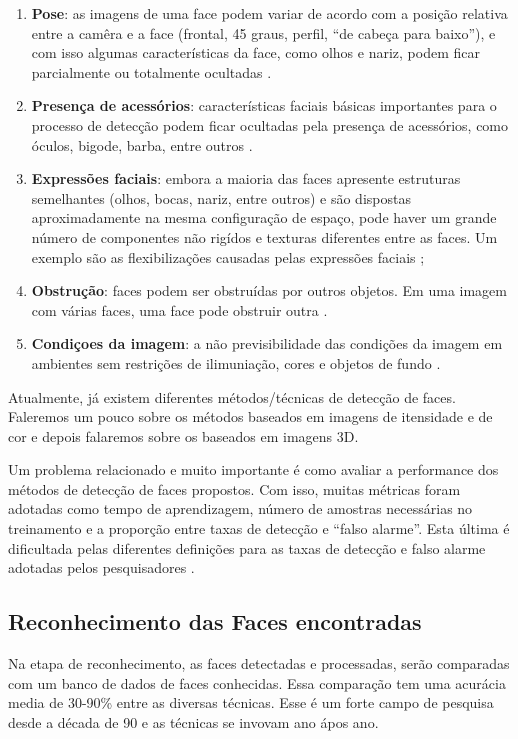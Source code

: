 	\begin{enumerate}
		\item \textbf{Pose}: as imagens de uma face podem variar de acordo com a posição relativa entre a camêra e a face (frontal, 45 graus, perfil, ``de cabeça para baixo''), e com isso algumas características da face, como olhos e nariz, podem ficar parcialmente ou totalmente ocultadas \cite{yang}.
		\item \textbf{Presença de acessórios}: características faciais básicas importantes para o processo de detecção podem ficar ocultadas pela presença de acessórios, como óculos, bigode, barba, entre outros \cite{oliveira, yang}. 
		\item \textbf{Expressões faciais}: embora a maioria das faces apresente estruturas semelhantes (olhos, bocas, nariz, entre outros) e são dispostas aproximadamente na mesma configuração de espaço, pode haver um grande número de componentes não rigídos e texturas diferentes entre as faces. Um exemplo são as flexibilizações causadas pelas expressões faciais \cite{oliveira, yang};
		\item \textbf{Obstrução}: faces podem ser obstruídas por outros objetos. Em uma imagem com várias faces, uma face pode obstruir outra \cite{yang}.
		\item \textbf{Condiçoes da imagem}: a não previsibilidade das condições da imagem em ambientes sem restrições de ilimuniação, cores e objetos de fundo \cite{oliveira, yang}.
	\end{enumerate}

Atualmente, já existem diferentes métodos/técnicas de detecção de faces. Faleremos um pouco sobre os métodos baseados em imagens de itensidade e de cor e depois falaremos sobre os baseados em imagens 3D.

Um problema relacionado e muito importante é como avaliar a performance dos métodos de detecção de faces propostos. Com isso, muitas métricas foram adotadas como tempo de aprendizagem, número de amostras necessárias no treinamento e a proporção entre taxas de detecção e ``falso alarme''. Esta última é dificultada pelas diferentes definições para as taxas de detecção e falso alarme adotadas pelos pesquisadores \cite{yang}.

\subsection{Reconhecimento das Faces encontradas}

Na etapa de reconhecimento, as faces detectadas e processadas, serão comparadas com um banco de dados de faces conhecidas. Essa comparação tem uma acurácia media de 30-90\% entre as diversas técnicas. Esse é um forte campo de pesquisa desde a década de 90 e as técnicas se invovam ano ápos ano.

